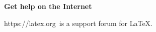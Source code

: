\documentclass{article}
\begin{document}
\sffamily\bfseries Get help on the Internet

\normalfont\ttfamily https://latex.org\normalfont\ is
a support forum for \LaTeX.
\end{document}

